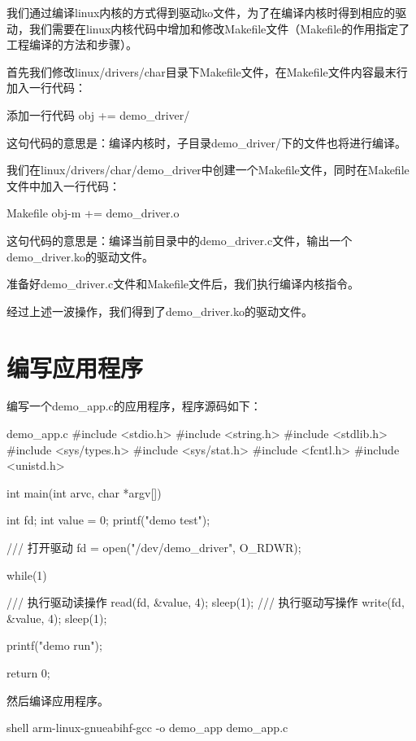 \documentclass[lang=cn,newtx,10pt,scheme=chinese]{elegantbook}
\begin{document}
我们通过编译linux内核的方式得到驱动ko文件，为了在编译内核时得到相应的驱动，我们需要在linux内核代码中增加和修改Makefile文件（Makefile的作用指定了工程编译的方法和步骤）。

首先我们修改linux/drivers/char目录下Makefile文件，在Makefile文件内容最末行加入一行代码：

\begin{mycode}{添加一行代码}
obj += demo_driver/
\end{mycode}

这句代码的意思是：编译内核时，子目录demo\_driver/下的文件也将进行编译。

我们在linux/drivers/char/demo\_driver中创建一个Makefile文件，同时在Makefile文件中加入一行代码：

\begin{mycode}{Makefile}
obj-m += demo_driver.o
\end{mycode}

这句代码的意思是：编译当前目录中的demo\_driver.c文件，输出一个demo\_driver.ko的驱动文件。

准备好demo\_driver.c文件和Makefile文件后，我们执行编译内核指令。

经过上述一波操作，我们得到了demo\_driver.ko的驱动文件。

\section{编写应用程序}

编写一个demo\_app.c的应用程序，程序源码如下：

\begin{mycode}{demo\_app.c}
#include <stdio.h> 
#include <string.h> 
#include <stdlib.h>
#include <sys/types.h>
#include <sys/stat.h> 
#include <fcntl.h> 
#include <unistd.h>

int main(int arvc, char *argv[])
{
    int fd;
    int value = 0;
    printf("demo test\n");

    /// 打开驱动
    fd = open("/dev/demo_driver", O_RDWR);

    while(1)
    {
        /// 执行驱动读操作
        read(fd, &value, 4);
        sleep(1);
        /// 执行驱动写操作
        write(fd, &value, 4);
        sleep(1);    
        
        printf("demo run\n");
    }
    return 0;
}
\end{mycode}

然后编译应用程序。

\begin{mycode}{shell}
arm-linux-gnueabihf-gcc -o demo_app demo_app.c
\end{mycode}
\end{document}
